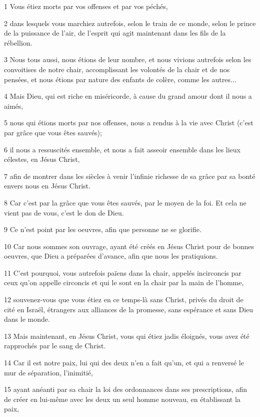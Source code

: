 \par 1 Vous étiez morts par vos offenses et par vos péchés,
\par 2 dans lesquels vous marchiez autrefois, selon le train de ce monde, selon le prince de la puissance de l'air, de l'esprit qui agit maintenant dans les fils de la rébellion.
\par 3 Nous tous aussi, nous étions de leur nombre, et nous vivions autrefois selon les convoitises de notre chair, accomplissant les volontés de la chair et de nos pensées, et nous étions par nature des enfants de colère, comme les autres...
\par 4 Mais Dieu, qui est riche en miséricorde, à cause du grand amour dont il nous a aimés,
\par 5 nous qui étions morts par nos offenses, nous a rendus à la vie avec Christ (c'est par grâce que vous êtes sauvés);
\par 6 il nous a ressuscités ensemble, et nous a fait asseoir ensemble dans les lieux célestes, en Jésus Christ,
\par 7 afin de montrer dans les siècles à venir l'infinie richesse de sa grâce par sa bonté envers nous en Jésus Christ.
\par 8 Car c'est par la grâce que vous êtes sauvés, par le moyen de la foi. Et cela ne vient pas de vous, c'est le don de Dieu.
\par 9 Ce n'est point par les oeuvres, afin que personne ne se glorifie.
\par 10 Car nous sommes son ouvrage, ayant été créés en Jésus Christ pour de bonnes oeuvres, que Dieu a préparées d'avance, afin que nous les pratiquions.
\par 11 C'est pourquoi, vous autrefois païens dans la chair, appelés incirconcis par ceux qu'on appelle circoncis et qui le sont en la chair par la main de l'homme,
\par 12 souvenez-vous que vous étiez en ce temps-là sans Christ, privés du droit de cité en Israël, étrangers aux alliances de la promesse, sans espérance et sans Dieu dans le monde.
\par 13 Mais maintenant, en Jésus Christ, vous qui étiez jadis éloignés, vous avez été rapprochés par le sang de Christ.
\par 14 Car il est notre paix, lui qui des deux n'en a fait qu'un, et qui a renversé le mur de séparation, l'inimitié,
\par 15 ayant anéanti par sa chair la loi des ordonnances dans ses prescriptions, afin de créer en lui-même avec les deux un seul homme nouveau, en établissant la paix,
